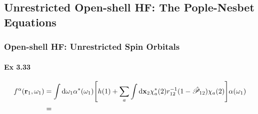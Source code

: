 \documentclass[a4paper]{article}
\newcommand{\hsP}{\hat{\mathscr{P}}}
\newcommand{\ex}[1]{\paragraph{Ex #1}}
\numberwithin{equation}{subsection}
\begin{document}
\subsection{Unrestricted Open-shell HF: The Pople-Nesbet Equations}
\subsubsection{Open-shell HF: Unrestricted Spin Orbitals}
\ex{3.33}
\begin{align}
f^\alpha(\vb{r}_1, \omega_1) &= \int\dd\omega_1 \alpha^*(\omega_1) 
\qty[h(1) + \sum_a\int\dd\vb{x}_2 \chi_a^*(2)r_{12}^{-1}(1-\hsP_{12})\chi_a(2)] \alpha(\omega_1) \notag\\
&=
\end{align}
\end{document}
